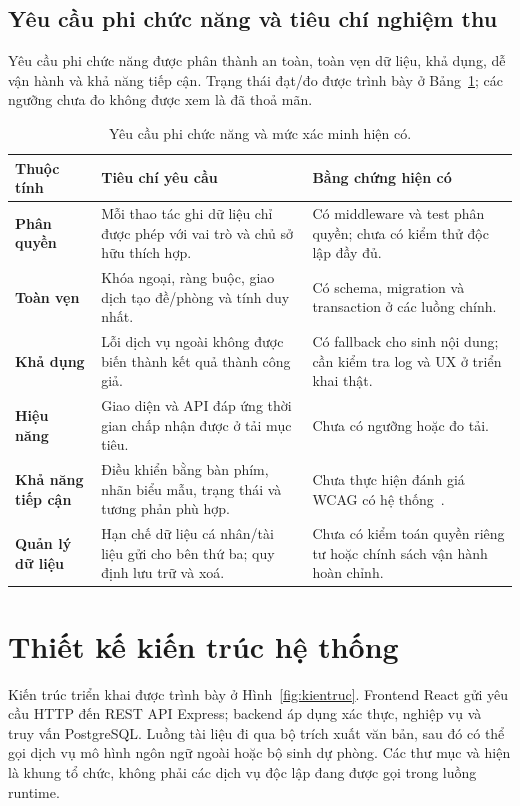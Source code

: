 \subsection{Yêu cầu phi chức năng và tiêu chí nghiệm thu}
Yêu cầu phi chức năng được phân thành an toàn, toàn vẹn dữ liệu, khả dụng,
dễ vận hành và khả năng tiếp cận. Trạng thái đạt/đo được trình bày ở
Bảng~\ref{tab:nfr}; các ngưỡng chưa đo không được xem là đã thoả mãn.
\begin{table}[H]
\centering
\caption{Yêu cầu phi chức năng và mức xác minh hiện có.}
\label{tab:nfr}
\begin{tabularx}{\textwidth}{>{\bfseries\color{daunavy}}p{} X p{}}
\toprule
\rowcolor{gray100}Thuộc tính & Tiêu chí yêu cầu & Bằng chứng hiện có \\
\midrule
Phân quyền & Mỗi thao tác ghi dữ liệu chỉ được phép với vai trò và chủ sở hữu thích hợp. & Có middleware và test phân quyền; chưa có kiểm thử độc lập đầy đủ. \\
Toàn vẹn & Khóa ngoại, ràng buộc, giao dịch tạo đề/phòng và tính duy nhất. & Có schema, migration và transaction ở các luồng chính. \\
Khả dụng & Lỗi dịch vụ ngoài không được biến thành kết quả thành công giả. & Có fallback cho sinh nội dung; cần kiểm tra log và UX ở triển khai thật. \\
Hiệu năng & Giao diện và API đáp ứng thời gian chấp nhận được ở tải mục tiêu. & Chưa có ngưỡng hoặc đo tải. \\
Khả năng tiếp cận & Điều khiển bằng bàn phím, nhãn biểu mẫu, trạng thái và tương phản phù hợp. & Chưa thực hiện đánh giá WCAG có hệ thống~\cite{WCAG22}. \\
Quản lý dữ liệu & Hạn chế dữ liệu cá nhân/tài liệu gửi cho bên thứ ba; quy định lưu trữ và xoá. & Chưa có kiểm toán quyền riêng tư hoặc chính sách vận hành hoàn chỉnh. \\
\bottomrule
\end{tabularx}
\end{table}

\section{Thiết kế kiến trúc hệ thống}

Kiến trúc triển khai được trình bày ở Hình~\ref{fig:kientruc}. Frontend
React gửi yêu cầu HTTP đến REST API Express; backend áp dụng xác thực,
nghiệp vụ và truy vấn PostgreSQL. Luồng tài liệu đi qua bộ trích xuất văn
bản, sau đó có thể gọi dịch vụ mô hình ngôn ngữ ngoài hoặc bộ sinh dự phòng.
Các thư mục  và  hiện là khung tổ chức,
không phải các dịch vụ độc lập đang được gọi trong luồng runtime.

